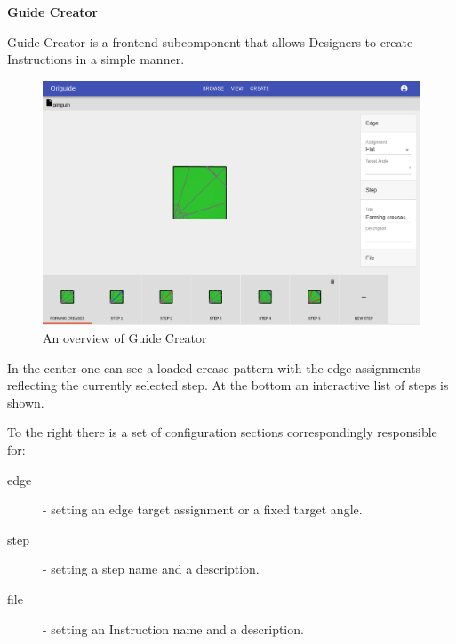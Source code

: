 \medskip


\textbf{Guide Creator}

\medskip

Guide Creator is a frontend subcomponent that allows Designers to create Instructions in a simple manner.


\begin{figure}[H]
  \caption{An overview of Guide Creator}
  \centering
    \includegraphics[width=\textwidth]{assets/3-component-creator.png}
\end{figure}

In the center one can see a loaded crease pattern with the edge assignments reflecting the currently selected step. At the bottom an interactive list of steps is shown.

\medskip

To the right there is a set of configuration sections correspondingly responsible for: \begin{description}
	\item[edge] - setting an edge target assignment or a fixed target angle.
	\item[step] - setting a step name and a description.
	\item[file] - setting an Instruction name and a description.
\end{description}

\medskip

